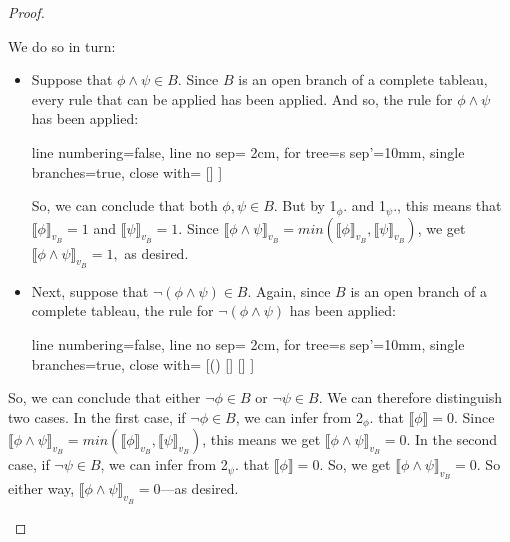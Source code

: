 \begin{enumerate}[\thesection.1]
\begin{proof}
\begin{enumerate}[(i)]
\begin{enumerate}[(a)]
		We do so in turn:
		
		\begin{itemize}
		
			\item Suppose that $\phi\land \psi\in B$. Since $B$ is an open branch of a complete tableau, every rule that can be applied has been applied. And so, the rule for $\phi\land \psi$ has been applied:
			\begin{center}
				\begin{prooftree}
					{
					line numbering=false,
					line no sep= 2cm,
					for tree={s sep'=10mm},
					single branches=true,
					close with=\xmark
					}
					[\phi\land\psi [\phi [\psi ] ] ]
					\end{prooftree}
				\end{center}
		So, we can conclude that both $\phi,\psi\in B$. But by 1$_\phi$. and 1$_\psi$., this means that $\llbracket\phi\rrbracket_{v_B}=1$ and $\llbracket\psi\rrbracket_{v_B}=1$. Since $\llbracket\phi\land \psi\rrbracket_{v_B}=min(\llbracket\phi\rrbracket_{v_B},\llbracket\psi\rrbracket_{v_B})$, we get $\llbracket\phi\land \psi\rrbracket_{v_B}=1,$ as desired.
		
		
		\item Next, suppose that $\neg (\phi\land \psi)\in B$. Again, since $B$ is an open branch of a complete tableau, the rule for $\neg(\phi\land \psi)$ has been applied:
		\begin{center}
				\begin{prooftree}
					{
					line numbering=false,
					line no sep= 2cm,
					for tree={s sep'=10mm},
					single branches=true,
					close with=\xmark
					}
					[\neg(\phi\land\psi) [\neg\phi ] [\neg\psi ] ]
					\end{prooftree}
				\end{center}
		
		\end{itemize}
	So, we can conclude that either $\neg\phi\in B$ or $\neg\psi\in B$. We can therefore distinguish two cases. In the first case, if $\neg\phi\in B$, we can infer from 2$_\phi$. that $\llbracket \phi\rrbracket=0$. Since $\llbracket\phi\land \psi\rrbracket_{v_B}=min(\llbracket\phi\rrbracket_{v_B},\llbracket\psi\rrbracket_{v_B})$, this means we get $\llbracket\phi\land \psi\rrbracket_{v_B}=0$. In the second case, if $\neg\psi\in B$, we can infer from 2$_\psi$. that $\llbracket \phi\rrbracket=0$. So, we get $\llbracket\phi\land \psi\rrbracket_{v_B}=0$. So either way,  $\llbracket\phi\land \psi\rrbracket_{v_B}=0$---as desired.
		

\end{enumerate}
\end{enumerate}
\end{proof}
\end{enumerate}
